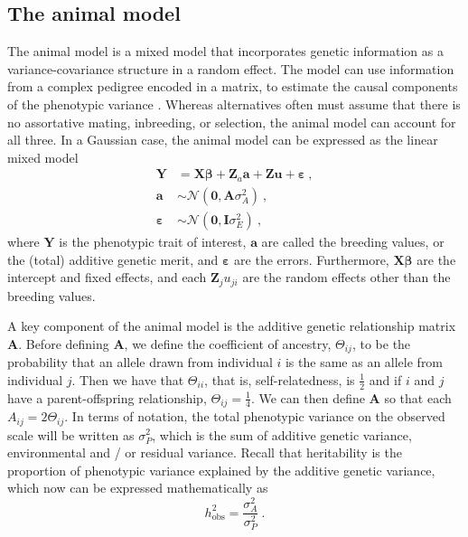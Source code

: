 \subsection{The animal model} \label{sec:theory:animal model}

The animal model is a mixed model that incorporates genetic information as a variance-covariance structure in a random effect. The model can use information from a complex pedigree encoded in a matrix, to estimate the causal components of the phenotypic variance \autocite{kruuk2004}. Whereas alternatives often must assume that there is no assortative mating, inbreeding, or selection, the animal model can account for all three. In a Gaussian case, the animal model can be expressed as the linear mixed model
\begin{align}
    \label{eq:animal model gaussian}
        \bm Y &= \bm X\bm\beta + \bm Z_a \bm a + \bm Z \bm u + \bm \varepsilon \ , \\
        \bm a &\sim \mathcal N(\bm 0,\bm A \sigma^2_A) \ , \nonumber \\
        \bm \varepsilon & \sim \mathcal N(\bm 0,\bm I \sigma^2_E) \ , \nonumber
\end{align}
where $\bm Y$ is the phenotypic trait of interest, $\bm a$ are called the breeding values, or the (total) additive genetic merit, and $\bm \varepsilon$ are the errors. Furthermore, $\bm X\bm \beta$ are the intercept and fixed effects, and each $\bm Z_j u_{ji}$ are the random effects other than the breeding values.

A key component of the animal model is the additive genetic relationship matrix $\bm A$.
Before defining $\bm A$, we define the coefficient of ancestry, $\Theta_{ij}$, to be the probability that an allele drawn from individual $i$ is the same as an allele from individual $j$. Then we have that $\Theta_{ii}$, that is, self-relatedness, is $\frac12$ and if $i$ and $j$ have a parent-offspring relationship, $\Theta_{ij}=\frac14$. We can then define $\bm A$ so that each $A_{ij} = 2\Theta_{ij}$.
In terms of notation, the total phenotypic variance on the observed scale will be written as $\sigma^2_P$, which is the sum of additive genetic variance, environmental and / or residual variance. Recall that heritability is the proportion of phenotypic variance explained by the additive genetic variance, which now can be expressed mathematically as
\begin{equation}
 h^2_\text{obs} = \frac{\sigma^2_A}{\sigma^2_P} \ .
\end{equation}


